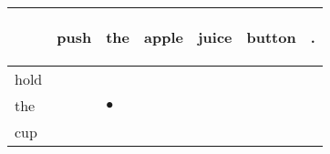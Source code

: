 \documentclass[landscape]{article}
\newcommand{\ssp}{\hspace{2pt}}
\newcommand{\mex}{\cellcolor{g}$\bullet$}
\begin{document}
\newpage

\noindent\begin{tabular}{|l|p{10pt}|p{10pt}|p{10pt}|p{10pt}|p{10pt}|p{10pt}|}
\hline
&\begin{sideways}\cellcolor{ref0}push\hspace{12pt}\end{sideways}&\begin{sideways}\cellcolor{ref1}the\hspace{12pt}\end{sideways}&\begin{sideways}\cellcolor{ref2}apple\hspace{12pt}\end{sideways}&\begin{sideways}\cellcolor{ref3}juice\hspace{12pt}\end{sideways}&\begin{sideways}\cellcolor{ref4}button\hspace{12pt}\end{sideways}&\begin{sideways}\cellcolor{ref5}.\hspace{12pt}\end{sideways}\\
\hline
\ssp hold \ssp&\hspace{2pt}&\hspace{2pt}&\hspace{2pt}&\hspace{2pt}&\hspace{2pt}&\hspace{2pt}\\
\hline
\ssp \cellcolor{ref1}the \ssp&\hspace{2pt}&\hspace{2pt}\mex&\hspace{2pt}&\hspace{2pt}&\hspace{2pt}&\hspace{2pt}\\
\hline
\ssp cup \ssp&\hspace{2pt}&\hspace{2pt}&\hspace{2pt}&\hspace{2pt}&\hspace{2pt}&\hspace{2pt}\\

\end{tabular}
\end{document}
